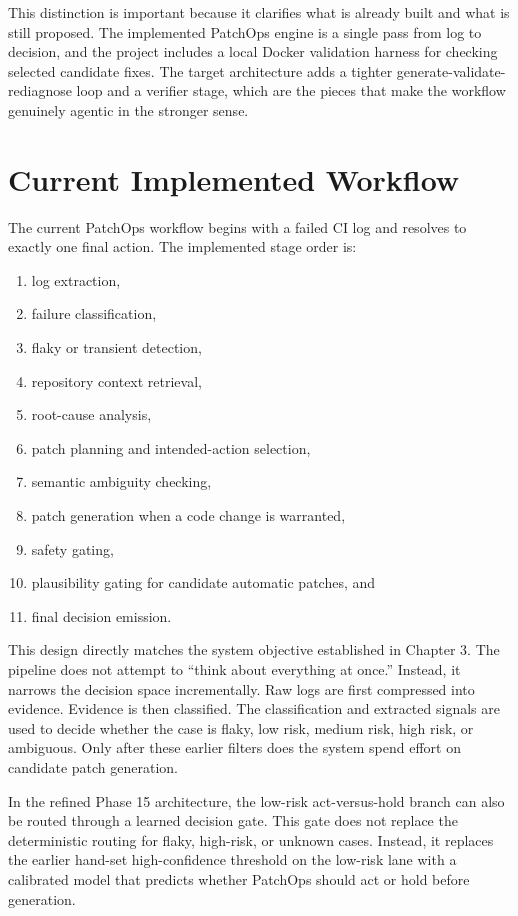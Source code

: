 This distinction is important because it clarifies what is already built and what is still proposed. The
implemented PatchOps engine is a single pass from log to decision, and the project includes a local Docker
validation harness for checking selected candidate fixes. The target architecture adds a tighter
generate-validate-rediagnose loop and a verifier stage, which are the pieces that make the workflow genuinely
agentic in the stronger sense.

\section{Current Implemented Workflow}

The current PatchOps workflow begins with a failed CI log and resolves to exactly one final action. The
implemented stage order is:

\begin{enumerate}
\item log extraction,
\item failure classification,
\item flaky or transient detection,
\item repository context retrieval,
\item root-cause analysis,
\item patch planning and intended-action selection,
\item semantic ambiguity checking,
\item patch generation when a code change is warranted,
\item safety gating,
\item plausibility gating for candidate automatic patches, and
\item final decision emission.
\end{enumerate}

This design directly matches the system objective established in Chapter 3. The pipeline does not attempt to
``think about everything at once.'' Instead, it narrows the decision space incrementally. Raw logs are first
compressed into evidence. Evidence is then classified. The classification and extracted signals are used to
decide whether the case is flaky, low risk, medium risk, high risk, or ambiguous. Only after these earlier
filters does the system spend effort on candidate patch generation.

In the refined Phase 15 architecture, the low-risk act-versus-hold branch can also be routed through a learned
decision gate. This gate does not replace the deterministic routing for flaky, high-risk, or unknown cases.
Instead, it replaces the earlier hand-set high-confidence threshold on the low-risk lane with a calibrated model
that predicts whether PatchOps should act or hold before generation.

